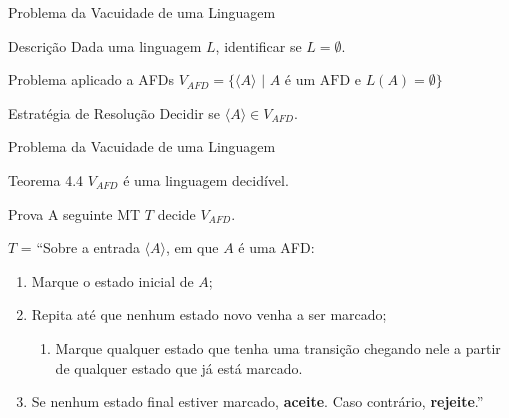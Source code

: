 \documentclass[xcolor=dvipsnames,table]{beamer}
\begin{document}
	\begin{frame}{Problema da Vacuidade de uma Linguagem}
		\begin{block}{Descrição}
			Dada uma linguagem $L$, identificar se $L = \emptyset$.
		\end{block}	
		\begin{block}{Problema aplicado a AFDs}
			$V_{AFD} = \{ \langle A \rangle \mbox{ | } A \mbox{ é um AFD e } L(A) = \emptyset \}$
		\end{block} 
		\begin{block}{Estratégia de Resolução}
			Decidir se $\langle A \rangle \in V_{AFD}$.
		\end{block}
	\end{frame}	
	
	\begin{frame}{Problema da Vacuidade de uma Linguagem}
		\begin{block}{Teorema 4.4}
			$V_{AFD}$ é uma linguagem decidível.
		\end{block} \pause
		\begin{block}{Prova}
			A seguinte MT $T$ decide $V_{AFD}$.
			
			$T$ = ``Sobre a entrada $\langle A \rangle$, em que $A$ é uma AFD:
			\begin{enumerate}
				\item Marque o estado inicial de $A$;
				\item Repita até que nenhum estado novo venha a ser marcado;
				\begin{enumerate}
					\item Marque qualquer estado que tenha uma transição chegando nele a partir de qualquer estado que já está marcado.
				\end{enumerate}
				\item Se nenhum estado final estiver marcado, {\bf aceite}. Caso contrário, {\bf rejeite}.''
			\end{enumerate}
		\end{block}
	\end{frame}
	
	\begin{frame}
		\titlepage
	\end{frame}
	
\end{document}
